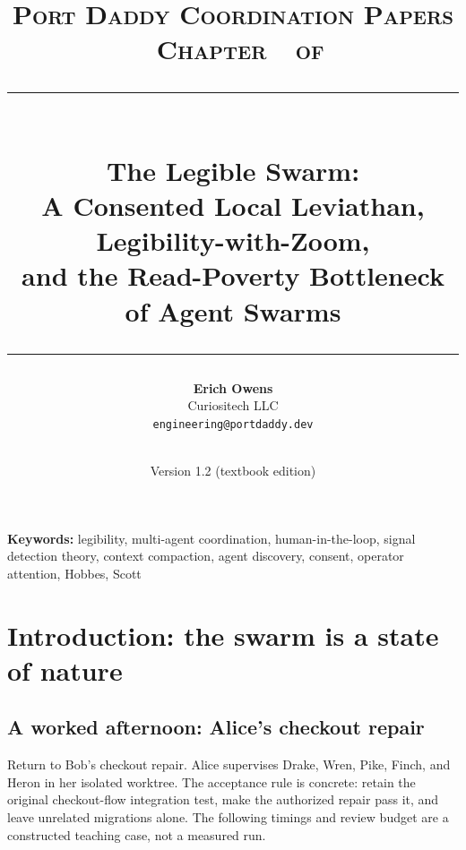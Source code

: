 \documentclass[11pt,a4paper]{article}
\title{
  \vspace{-1cm}
  {\Large\textsc{Port Daddy Coordination Papers \textperiodcentered\ Chapter~\pdchapternumber\ of \pdchaptercount}}\\[
0.5cm]
  \rule{\textwidth}{0.5pt}\\[0.3cm]
  {\LARGE\textbf{The Legible Swarm:}}\\[0.2cm]
  {\Large A Consented Local Leviathan, Legibility-with-Zoom,\\and the Read-Poverty Bottleneck of Agent Swarms}\\[0.3cm]
  \rule{\textwidth}{0.5pt}
}
\author{
  \textbf{Erich Owens}\\[0.2cm]
  Curiositech LLC\\[0.2cm]
  \texttt{engineering@portdaddy.dev}
}
\date{\pdeditiondate\\Version 1.2 (textbook edition)}
\theoremstyle{definition}
\theoremstyle{plain}
\begin{document}
\pdopensolutions
\setlength{\emergencystretch}{2em}
\maketitle
\thispagestyle{empty}
\vspace{0.6cm}
\vspace{0.4cm}
\noindent\textbf{Keywords:} legibility, multi-agent coordination, human-in-the-loop,
signal detection theory, context compaction, agent discovery, consent, operator
attention, Hobbes, Scott
\vspace{0.4cm}
\section{Introduction: the swarm is a state of \mbox{nature}}\label{sec:intro}
\subsection{A worked afternoon: Alice's checkout repair}\label{sec:mara}\label{sec:mira}
Return to Bob's checkout repair. Alice supervises Drake, Wren, Pike, Finch,
and Heron in her isolated worktree. The acceptance rule is concrete: retain the
original checkout-flow integration test, make the authorized repair pass it,
and leave unrelated migrations alone. The following timings and review budget
are a constructed teaching case, not a measured run.
\end{document}
